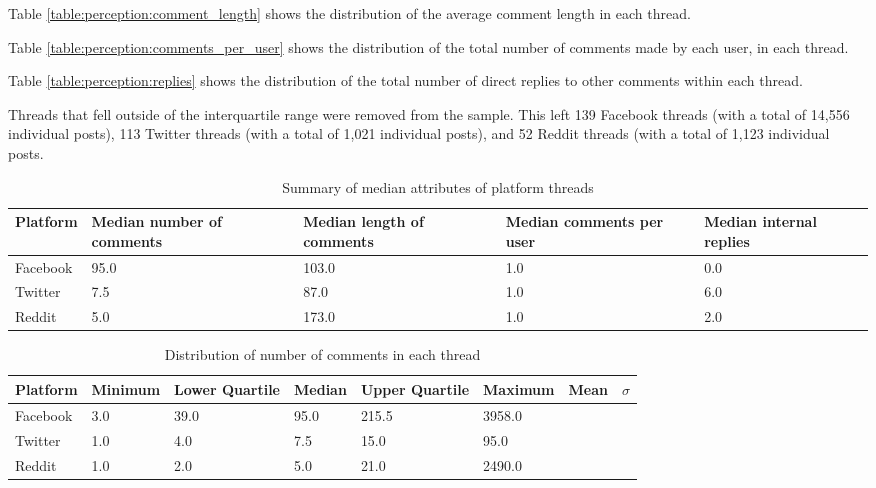 Table \ref{table:perception:comment_length}  shows the distribution of the average comment length in each thread. 

Table \ref{table:perception:comments_per_user}  shows the distribution of the total number of comments made by each user, in each thread. 

Table \ref{table:perception:replies}  shows the distribution of the total number of direct replies to other comments within each thread. 

Threads that fell outside of the interquartile range were removed from the sample. This left 139 Facebook threads (with a total of 14,556 individual posts), 113 Twitter threads (with a total of 1,021 individual posts), and 52 Reddit threads (with a total of 1,123 individual posts.



\begin{table}
\centering
\caption{ Summary of median attributes of platform threads}
\label{table:perception:median_summary}
\begin{tabular}{ l | p{3cm} | p{3cm} | p{3cm} | p{3cm}}
\textbf{Platform} & \textbf{Median number of comments} & \textbf{Median length of comments} & \textbf{Median comments per user} & \textbf{Median internal replies} \\
\hline
Facebook & 95.0 & 103.0 & 1.0 & 0.0\\
\hline
Twitter & 7.5 & 87.0 & 1.0 & 6.0\\
\hline
Reddit & 5.0 & 173.0 & 1.0 & 2.0\\
\end{tabular}
\end{table}

\begin{table}
\centering
\caption{Distribution of number of comments in each thread}
\label{table:perception:number_comment}
\begin{tabular}{ l | l | l | l | l | l | l | l}
\textbf{Platform} & \textbf{Minimum} & \textbf{Lower Quartile} & \textbf{Median} & \textbf{Upper Quartile} & \textbf{Maximum} & \textbf{Mean} & \textbf{$\sigma$}\\
\hline
Facebook & 3.0 & 39.0 & 95.0 & 215.5 & 3958.0 &  & \\
\hline
Twitter & 1.0 & 4.0 & 7.5 & 15.0 & 95.0 &  & \\
\hline
Reddit & 1.0 & 2.0 & 5.0 & 21.0 & 2490.0 &  & \\
\end{tabular}
\end{table}

